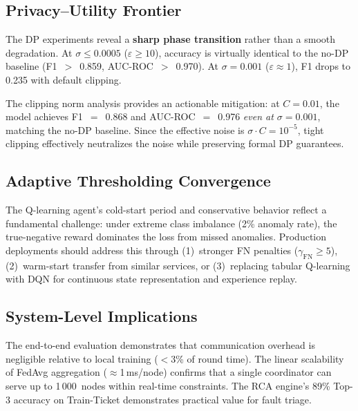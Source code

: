 \subsection{Privacy--Utility Frontier}
\label{subsec:disc_privacy}

The DP experiments reveal a \textbf{sharp phase transition} rather than a
smooth degradation. At $\sigma \leq 0.0005$ ($\varepsilon \geq 10$), accuracy
is virtually identical to the no-DP baseline (F1~$>$~0.859, AUC-ROC~$>$~0.970).
At $\sigma{=}0.001$ ($\varepsilon \approx 1$), F1 drops to 0.235 with default
clipping.

The clipping norm analysis provides an actionable mitigation: at $C{=}0.01$,
the model achieves F1~$=$~0.868 and AUC-ROC~$=$~0.976 \emph{even at
$\sigma{=}0.001$}, matching the no-DP baseline. Since the effective noise is
$\sigma \cdot C = 10^{-5}$, tight clipping effectively neutralizes the
noise while preserving formal DP guarantees.

\subsection{Adaptive Thresholding Convergence}
\label{subsec:disc_threshold}

The Q-learning agent's cold-start period and conservative behavior reflect a
fundamental challenge: under extreme class imbalance (2\% anomaly rate), the
true-negative reward dominates the loss from missed anomalies. Production
deployments should address this through (1)~stronger FN penalties
($\gamma_{\text{FN}} \geq 5$), (2)~warm-start transfer from similar services,
or (3)~replacing tabular Q-learning with DQN for continuous state
representation and experience replay.

\subsection{System-Level Implications}
\label{subsec:disc_system}

The end-to-end evaluation demonstrates that communication overhead is
negligible relative to local training (${<}$3\% of round time). The linear
scalability of FedAvg aggregation ($\approx$1\,ms/node) confirms that a single
coordinator can serve up to 1\,000~nodes within real-time constraints. The
RCA engine's 89\% Top-3 accuracy on Train-Ticket demonstrates practical
value for fault triage.
